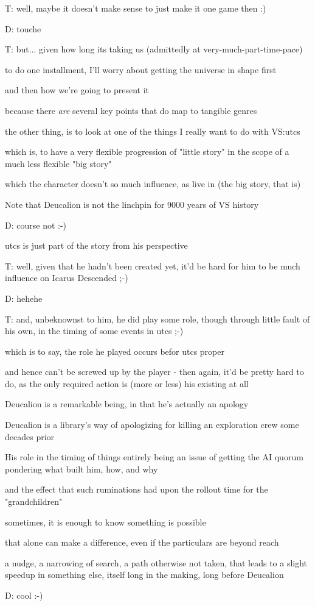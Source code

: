 T: well, maybe it doesn't make sense to just make it one game then :)

D: touche

T: but... given how long its taking us (admittedly at very-much-part-time-pace)

to do one installment, I'll worry about getting the universe in shape first

and then how we're going to present it

because there {\em are} several key points that do map to tangible genres

the other thing, is to look at one of the things I really want to do with VS:utcs

which is, to have a very flexible progression of "little story" in the scope of a much less flexible "big story"

which the character doesn't so much influence, as live in (the big story, that is)

Note that Deucalion is not the linchpin for 9000 years of VS history

D: course not :-)

utcs is just part of the story from his perspective

T: well, given that he hadn't been created yet, it'd be hard for him to be much influence on Icarus Descended ;-)

D: hehehe

T: and, unbeknownst to him, he did play some role, though through little fault of his own, in the timing of some events in utcs ;-)

which is to say, the role he played occurs befor utcs proper

and hence can't be screwed up by the player - then again, it'd be pretty hard to do, as the only required action is (more or less) his existing at all 

Deucalion is a remarkable being, in that he's actually an apology

Deucalion is a library's way of apologizing for killing an exploration crew some decades prior

His role in the timing of things entirely being an issue of getting the AI quorum pondering what built him, how, and why

and the effect that such ruminations had upon the rollout time for the "grandchildren"

sometimes, it is enough to know something is possible

that alone can make a difference, even if the particulars are beyond reach

a nudge, a narrowing of search, a path otherwise not taken, that leads to a slight speedup in something else, itself long in the making, long before Deucalion

D: cool :-)
